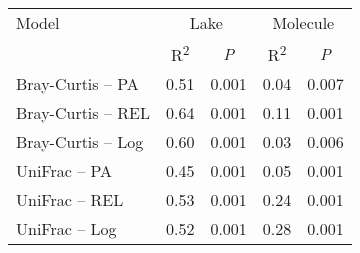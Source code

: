 \begin{table}[ht]
\centering
\begin{tabular}{l r r r r }
  \hline
\hline
  Model & \multicolumn{2}{c}{Lake} & \multicolumn{2}{c}{Molecule} \\
  & \multicolumn{1}{c}{R\textsuperscript{2}} & 
                          \multicolumn{1}{c}{\emph{P}} & 
                          \multicolumn{1}{c}{R\textsuperscript{2}} & 
                          \multicolumn{1}{c}{\emph{P}} \\
 \hline
Bray-Curtis -- PA & 0.51 & 0.001 & 0.04 & 0.007 \\ 
  Bray-Curtis -- REL & 0.64 & 0.001 & 0.11 & 0.001 \\ 
  Bray-Curtis -- Log & 0.60 & 0.001 & 0.03 & 0.006 \\ 
  UniFrac -- PA & 0.45 & 0.001 & 0.05 & 0.001 \\ 
  UniFrac -- REL & 0.53 & 0.001 & 0.24 & 0.001 \\ 
  UniFrac -- Log & 0.52 & 0.001 & 0.28 & 0.001 \\ 
   \hline
\end{tabular}
\end{table}
